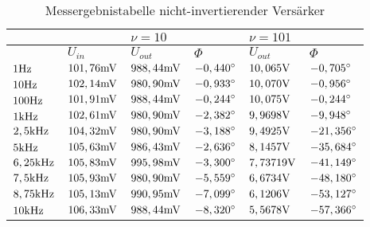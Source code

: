\begin{table}[H]
\centering
\caption{Messergebnistabelle nicht-invertierender Versärker}
\label{tab:niinv_erg_tab}
\begin{tabular}{ll||l|l||l|l|}
\cline{3-6}
                                                   &                & \multicolumn{2}{l|}{$\nu = 10$}     & \multicolumn{2}{l|}{$\nu=101$}          \\ \hline
\rowcolor[HTML]{C0C0C0} 
\multicolumn{1}{|l|}{\cellcolor[HTML]{C0C0C0}$f $} & $ U_{in}     $ & $ U_{out} $    & $ \Phi $           & $ U_{out} $       & $ \Phi $            \\ \hline
\multicolumn{1}{|l|}{$1\text{Hz}        $}               & $ 101,76\text{mV} $  & $ 988,44\text{mV}  $ & $ -0,440^\circ  $ & $ 10,065\text{V}      $ & $ -0,705^\circ   $ \\ \hline
\multicolumn{1}{|l|}{$10\text{Hz}      $}                & $ 102,14\text{mV} $  & $ 980,90\text{mV}  $ & $ -0,933^\circ  $ & $ 10,070\text{V}      $ & $ -0,956^\circ   $ \\ \hline
\multicolumn{1}{|l|}{$100\text{Hz}      $}               & $ 101,91\text{mV} $  & $ 988,44\text{mV}  $ & $ -0,244^\circ  $ & $ 10,075\text{V}      $ & $ -0,244^\circ   $ \\ \hline
\multicolumn{1}{|l|}{$1\text{kHz}      $}                & $ 102,61\text{mV} $  & $ 980,90\text{mV}  $ & $ -2,382^\circ  $ & $ 9,9698\text{V}      $ & $ -9,948^\circ  $  \\ \hline
\multicolumn{1}{|l|}{$2,5\text{kHz}    $}                & $ 104,32\text{mV} $  & $ 980,90\text{mV}  $ & $ -3,188^\circ  $ & $ 9,4925\text{V}      $ & $ -21,356^\circ  $ \\ \hline
\multicolumn{1}{|l|}{$5\text{kHz}      $}                & $ 105,63\text{mV} $  & $ 986,43\text{mV}  $ & $ -2,636^\circ  $ & $ 8,1457 \text{V}     $ & $ -35,684^\circ  $ \\ \hline
\multicolumn{1}{|l|}{$6,25\text{kHz}   $}                & $ 105,83\text{mV} $  & $ 995,98\text{mV}  $ & $ -3,300^\circ  $ & $ 7,73719\text{V}     $ & $ -41,149^\circ  $ \\ \hline
\multicolumn{1}{|l|}{$7,5\text{kHz}    $}                & $ 105,93\text{mV} $  & $ 980,90\text{mV}  $ & $ -5,559^\circ  $ & $ 6,6734\text{V}      $ & $ -48,180^\circ  $ \\ \hline
\multicolumn{1}{|l|}{$8,75\text{kHz}   $}                & $ 105,13\text{mV} $  & $ 990,95\text{mV}  $ & $ -7,099^\circ  $ & $ 6,1206\text{V}      $ & $ -53,127^\circ  $ \\ \hline
\multicolumn{1}{|l|}{$10\text{kHz}     $}                & $ 106,33\text{mV} $  & $ 988,44\text{mV}  $ & $ -8,320^\circ  $ & $ 5,5678\text{V}      $ & $ -57,366^\circ  $ \\ \hline

\end{tabular}
\end{table}
